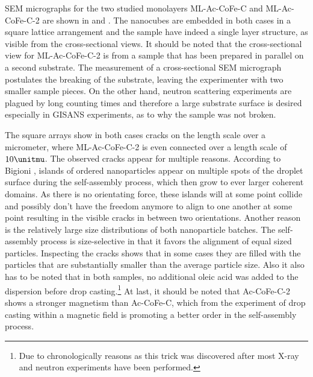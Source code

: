 \documentclass[\main/dresen_thesis.tex]{subfiles}
\begin{document}
  SEM micrographs for the two studied monolayers ML-Ac-CoFe-C and ML-Ac-CoFe-C-2 are shown in  and .
  The nanocubes are embedded in both cases in a square lattice arrangement and the sample have indeed a single layer structure, as visible from the cross-sectional views.
  It should be noted that the cross-sectional view for ML-Ac-CoFe-C-2 is from a sample that has been prepared in parallel on a second substrate.
  The measurement of a cross-sectional SEM micrograph postulates the breaking of the substrate, leaving the experimenter with two smaller sample pieces.
  On the other hand, neutron scattering experiments are plagued by long counting times and therefore a large substrate surface is desired especially in GISANS experiments, as to why the sample was not broken.

  The square arrays show in both cases cracks on the length scale over a micrometer, where ML-Ac-CoFe-C-2 is even connected over a length scale of $10 \unitmu$.
  The observed cracks appear for multiple reasons.
  According to Bigioni \etal \cite{Bigioni_2006_Kinet}, islands of ordered nanoparticles appear on multiple spots of the droplet surface during the self-assembly process, which then grow to ever larger coherent domains.
  As there is no orientating force, these islands will at some point collide and possibly don't have the freedom anymore to align to one another at some point resulting in the visible cracks in between two orientations.
  Another reason is the relatively large size distributions of both nanoparticle batches.
  The self-assembly process is size-selective in that it favors the alignment of equal sized particles.
  Inspecting the cracks shows that in some cases they are filled with the particles that are substantially smaller than the average particle size.
  Also it also has to be noted that in both samples, no additional oleic acid was added to the dispersion before drop casting.\footnote{Due to chronologically reasons as this trick was discovered after most X-ray and neutron experiments have been performed.}
  At last, it should be noted that Ac-CoFe-C-2 shows a stronger magnetism than Ac-CoFe-C, which from the experiment of drop casting within a magnetic field is promoting a better order in the self-assembly process.
\end{document}
